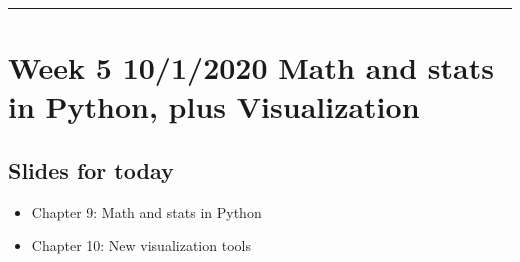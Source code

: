 \documentclass[letterpaper,10pt,english]{sphinxmanual}
\begin{document}
\bigskip\hrule\bigskip



\section{Week 5 \sphinxhyphen{} 10/1/2020 \sphinxhyphen{} Math and stats in Python, plus Visualization}
\label{\detokenize{course-schedule:week-5-10-1-2020-math-and-stats-in-python-plus-visualization}}

\subsection{Slides for today}
\label{\detokenize{course-schedule:id7}}\begin{itemize}
\item {} 
Chapter 9: Math and stats in Python

\item {} 
Chapter 10: New visualization tools

\end{itemize}
\end{document}
